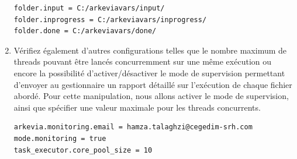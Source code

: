 \begin{enumerate}
\begin{lstlisting}[numbers=none]
folder.input = C:/arkeviavars/input/
folder.inprogress = C:/arkeviavars/inprogress/
folder.done = C:/arkeviavars/done/
\end{lstlisting}
\newpage
\item Vérifiez également d'autres configurations telles que le nombre maximum de threads pouvant être lancés concurremment sur une même exécution ou encore la possibilité d'activer/désactiver le mode de supervision permettant d'envoyer au gestionnaire un rapport détaillé sur l'exécution de chaque fichier abordé. Pour cette manipulation, nous allons activer le mode de supervision, ainsi que spécifier une valeur maximale pour les threads concurrents.\\
\begin{lstlisting}[numbers=none, deletekeywords={true}]
arkevia.monitoring.email = hamza.talaghzi@cegedim-srh.com
mode.monitoring = true
task_executor.core_pool_size = 10
\end{lstlisting}
\end{enumerate}

